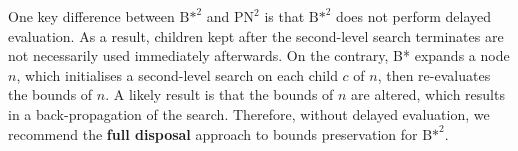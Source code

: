 One key difference between ${\text{B*}}^2$ and ${\text{PN}}^2$ is that ${\text{B*}}^2$ does not perform delayed evaluation. As a result, children kept after the second-level search terminates are not necessarily used immediately afterwards. On the contrary, B* expands a node $n$, which initialises a second-level search on each child $c$ of $n$, then re-evaluates the bounds of $n$. A likely result is that the bounds of $n$ are altered, which results in a back-propagation of the search. Therefore, without delayed evaluation, we recommend the \textbf{full disposal} approach to bounds preservation for ${\text{B*}}^2$.

